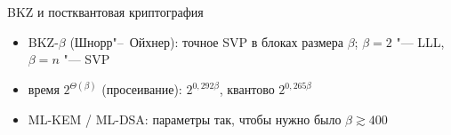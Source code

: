 \documentclass{ca-slides}
\begin{document}
\begin{canvasframe}{BKZ и постквантовая криптография}
  \begin{itemize}
    \item BKZ-$\beta$ (Шнорр"--~Ойхнер): точное SVP в блоках размера $\beta$;
      $\beta = 2$ "--- LLL, $\beta = n$ "--- SVP
    \item время $2^{\Theta(\beta)}$ (просеивание): $2^{0{,}292\beta}$, квантово
      $2^{0{,}265\beta}$
    \item ML-KEM / ML-DSA: параметры так, чтобы нужно было $\beta \gtrsim 400$
  \end{itemize}
  \notearea[0.25\textheight]
\end{canvasframe}
\end{document}
